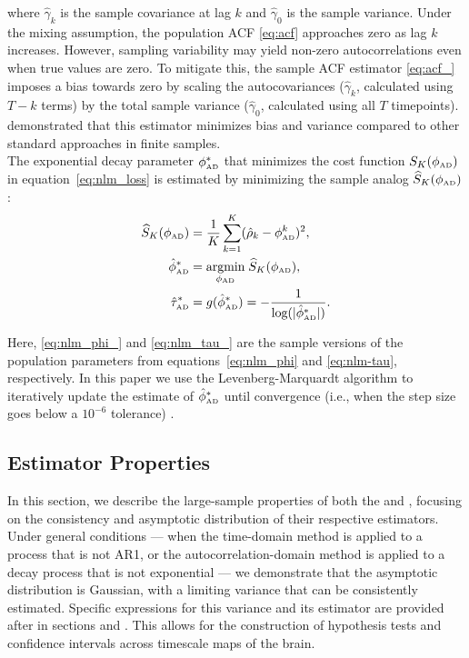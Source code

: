\documentclass[docs/main.tex]{subfiles}
\begin{document}
\noindent where $\hat\gamma_k$ is the sample covariance at lag $k$ and $\hat\gamma_0$ is the sample variance. Under the mixing assumption, the population ACF \eqref{eq:acf} approaches zero as lag $k$ increases. However, sampling variability may yield non-zero autocorrelations even when true values are zero. To mitigate this, the sample ACF estimator \eqref{eq:acf_} imposes a bias towards zero by scaling the autocovariances ($\hat \gamma_k$, calculated using $T-k$ terms) by the total sample variance ($\hat\gamma_0$, calculated using all $T$ timepoints). \citet{marriott_bias_1954} demonstrated that this estimator minimizes bias and variance compared to other standard approaches in finite samples.\\

The exponential decay parameter $\phi_{\scriptscriptstyle\text{AD}}^*$ that minimizes the cost function $S_K(\phi_{\scriptscriptstyle\text{AD}})$ in equation~\eqref{eq:nlm_loss} is estimated by minimizing the sample analog $\widehat{S}_{K}(\phi_{\scriptscriptstyle\text{AD}})$:
\begin{align}
    \widehat{S}_{K}(\phi_{\scriptscriptstyle\text{AD}}) &= \frac{1}{K} \sum_{k=1}^K (\hat\rho_k - \phi_{\scriptscriptstyle\text{AD}}^k)^2,\label{eq:nlm_loss_}\\
    \hat{\phi}^*_{\scriptscriptstyle\text{AD}} &= \underset{\phi_{\scriptscriptstyle\text{AD}}}{\text{argmin}} \; \widehat{S}_{K}(\phi_{\scriptscriptstyle\text{AD}}), \label{eq:nlm_phi_}\\
    \hat{\tau}^*_{\scriptscriptstyle\text{AD}} &= g(\hat{\phi}^*_{\scriptscriptstyle\text{AD}}) = -\frac{1}{\text{log}(|\hat{\phi}^*_{\scriptscriptstyle\text{AD}}|)}.\label{eq:nlm_tau_}
\end{align}

\noindent Here, \eqref{eq:nlm_phi_} and \eqref{eq:nlm_tau_} are the sample versions of the population parameters from equations~\eqref{eq:nlm_phi} and \eqref{eq:nlm-tau}, respectively. In this paper we use the Levenberg-Marquardt algorithm to iteratively update the estimate of $\hat{\phi}^*_{\scriptscriptstyle\text{AD}}$ until convergence (i.e., when the step size goes below a $10^{-6}$ tolerance) \citep{levenberg_method_1944}.

\subsection{Estimator Properties}\label{sec:estimator-properties}
In this section, we describe the large-sample properties of both the  and , focusing on the consistency and asymptotic distribution of their respective estimators. Under general conditions --- when the time-domain method is applied to a process that is not AR1, or the autocorrelation-domain method is applied to a decay process that is not exponential --- we demonstrate that the asymptotic distribution is Gaussian, with a limiting variance that can be consistently estimated. Specific expressions for this variance and its estimator are provided after in sections  and . This allows for the construction of hypothesis tests and confidence intervals across timescale maps of the brain.
\end{document}
